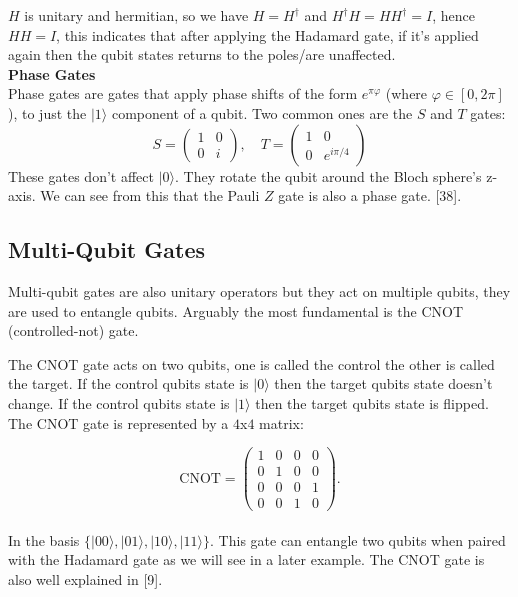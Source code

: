 \noindent $H$ is unitary and hermitian, so we have $H=H^\dagger$ and $H^\dagger H=HH^\dagger = I$, hence $HH=I$, this indicates that after applying the Hadamard gate, if it's applied again then the qubit states returns to the poles/are unaffected.
\\

\noindent\textbf{Phase Gates}\\
\noindent Phase gates are gates that apply phase shifts of the form $e^{\pi\varphi}$ (where $\varphi \in [0 ,2\pi]$), to just the $|1\rangle$ component of a qubit. Two common ones are the $S$ and $T$ gates:
\[
S = \begin{pmatrix} 1 & 0 \\ 0 & i \end{pmatrix}, \quad
T = \begin{pmatrix} 1 & 0 \\ 0 & e^{i\pi/4} \end{pmatrix}
\]
These gates don't affect $|0\rangle$. They rotate the qubit around the Bloch sphere’s z-axis. We can see from this that the Pauli $Z$ gate is also a phase gate. [38].



\subsection{Multi-Qubit Gates}

Multi-qubit gates are also unitary operators but they act on multiple qubits, they are used to entangle qubits. Arguably the most fundamental is the CNOT (controlled-not) gate.

\noindent The CNOT gate acts on two qubits, one is called the control the other is called the target. If the control qubits state is $|0\rangle$ then the target qubits state doesn't change. If the control qubits state is $|1\rangle$ then the target qubits state is flipped. The CNOT gate is represented by a $4$x$4$ matrix: 

\[
\text{CNOT} =
\begin{pmatrix}
1 & 0 & 0 & 0 \\
0 & 1 & 0 & 0 \\
0 & 0 & 0 & 1 \\
0 & 0 & 1 & 0
\end{pmatrix}.
\]\\
\noindent In the basis $\{|00\rangle, |01\rangle, |10\rangle, |11\rangle\}$. This gate can entangle two qubits when paired with the Hadamard gate as we will see in a later example. The CNOT gate is also well explained in [9].

